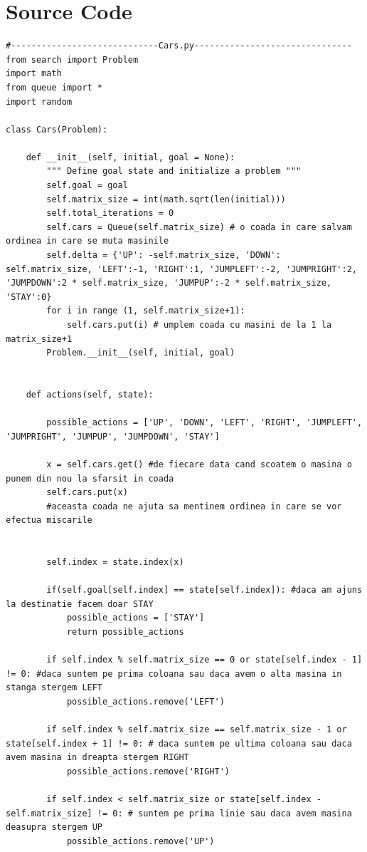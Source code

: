 \documentclass[14pt]{article}
\begin{document}
\section*{Source Code}
\begin{lstlisting}
#-----------------------------Cars.py-------------------------------
from search import Problem
import math
from queue import *
import random

class Cars(Problem):

    def __init__(self, initial, goal = None):
        """ Define goal state and initialize a problem """
        self.goal = goal
        self.matrix_size = int(math.sqrt(len(initial)))
        self.total_iterations = 0
        self.cars = Queue(self.matrix_size) # o coada in care salvam ordinea in care se muta masinile
        self.delta = {'UP': -self.matrix_size, 'DOWN': self.matrix_size, 'LEFT':-1, 'RIGHT':1, 'JUMPLEFT':-2, 'JUMPRIGHT':2, 'JUMPDOWN':2 * self.matrix_size, 'JUMPUP':-2 * self.matrix_size, 'STAY':0}
        for i in range (1, self.matrix_size+1):
            self.cars.put(i) # umplem coada cu masini de la 1 la matrix_size+1
        Problem.__init__(self, initial, goal)


    def actions(self, state):
        
        possible_actions = ['UP', 'DOWN', 'LEFT', 'RIGHT', 'JUMPLEFT', 'JUMPRIGHT', 'JUMPUP', 'JUMPDOWN', 'STAY']

        x = self.cars.get() #de fiecare data cand scoatem o masina o punem din nou la sfarsit in coada
        self.cars.put(x)
        #aceasta coada ne ajuta sa mentinem ordinea in care se vor efectua miscarile


        self.index = state.index(x)

        if(self.goal[self.index] == state[self.index]): #daca am ajuns la destinatie facem doar STAY
            possible_actions = ['STAY']
            return possible_actions

        if self.index % self.matrix_size == 0 or state[self.index - 1] != 0: #daca suntem pe prima coloana sau daca avem o alta masina in stanga stergem LEFT
            possible_actions.remove('LEFT')

        if self.index % self.matrix_size == self.matrix_size - 1 or state[self.index + 1] != 0: # daca suntem pe ultima coloana sau daca avem masina in dreapta stergem RIGHT
            possible_actions.remove('RIGHT')

        if self.index < self.matrix_size or state[self.index - self.matrix_size] != 0: # suntem pe prima linie sau daca avem masina deasupra stergem UP 
            possible_actions.remove('UP')
            

\end{lstlisting}
\end{document}
